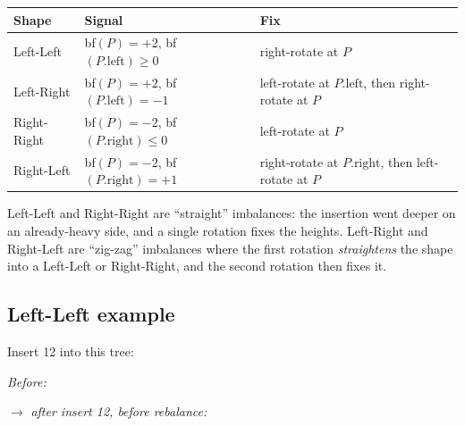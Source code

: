 \documentclass[11pt]{article}
\begin{document}
\begin{center}
\begin{tabular}{lll}
Shape       & Signal                       & Fix \\
\hline
Left-Left   & bf$(P) = +2$, bf$(P.\text{left}) \ge 0$  & right-rotate at $P$ \\
Left-Right  & bf$(P) = +2$, bf$(P.\text{left}) = -1$   & left-rotate at $P.\text{left}$, then right-rotate at $P$ \\
Right-Right & bf$(P) = -2$, bf$(P.\text{right}) \le 0$ & left-rotate at $P$ \\
Right-Left  & bf$(P) = -2$, bf$(P.\text{right}) = +1$  & right-rotate at $P.\text{right}$, then left-rotate at $P$ \\
\end{tabular}
\end{center}

Left-Left and Right-Right are ``straight'' imbalances: the insertion went deeper on an already-heavy side, and a single rotation fixes the heights. Left-Right and Right-Left are ``zig-zag'' imbalances where the first rotation \emph{straightens} the shape into a Left-Left or Right-Right, and the second rotation then fixes it.

\subsection*{Left-Left example}

Insert 12 into this tree:

\begin{center}
\emph{Before:}
\quad $\to$ \emph{after insert 12, before rebalance:}
\end{center}
\end{document}
